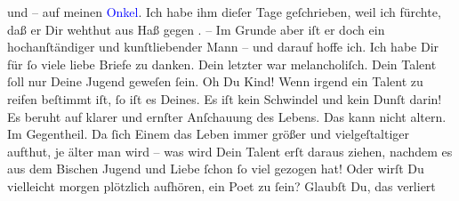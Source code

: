                   \label{K_L02762-8v}\label{K_L02762-8h} und – auf meinen \textcolor{blue}{Onkel}{}. Ich habe ihm dieſer Tage geſchrieben, weil ich  fürchte, daß er Dir wehthut aus Haß gegen \textsc{}{ }\label{K_L02762-9v}\label{K_L02762-9h}. – Im Grunde {\pb}aber iſt er doch ein hochanſtändiger und
               kunſtliebender Mann – und darauf hoffe ich.\pend
           \pstart
           Ich habe Dir für ſo viele liebe Briefe zu danken. Dein letzter war melancholiſch.
               Dein Talent ſoll nur Deine Jugend geweſen ſein. Oh Du Kind! Wenn irgend ein Talent zu
               reifen beſtimmt iſt, ſo iſt es Deines. Es iſt kein Schwindel und kein Dunſt darin! Es
               beruht auf klarer {\pb}und  ernſter Anſchauung des Lebens.  Das
               kann nicht altern. Im Gegentheil. Da ſich Einem das Leben immer größer und
               vielgeſtaltiger aufthut, je älter man wird – was wird Dein Talent erſt daraus ziehen,
                   nachdem es aus dem Bischen Jugend und Liebe
               ſchon ſo viel gezogen hat! Oder wirſt Du vielleicht morgen plötzlich {\pb}aufhören, ein Poet zu ſein? Glaubſt Du, das verliert
